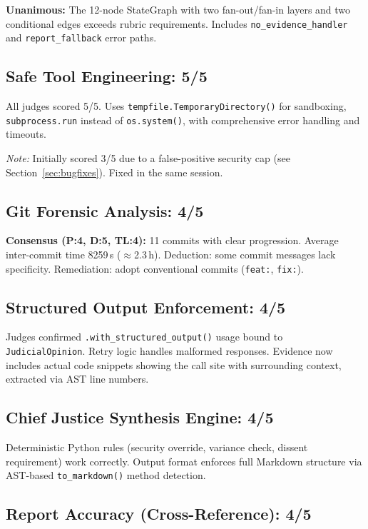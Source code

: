 \documentclass[11pt,a4paper]{article}
\begin{document}
\textbf{Unanimous:} The 12-node StateGraph with two fan-out/fan-in layers
and two conditional edges exceeds rubric requirements.  Includes
\texttt{no\_evidence\_handler} and \texttt{report\_fallback} error paths.

\subsection{Safe Tool Engineering: 5/5}

All judges scored 5/5.  Uses \texttt{tempfile.TemporaryDirectory()} for
sandboxing, \texttt{subprocess.run} instead of \texttt{os.system()}, with
comprehensive error handling and timeouts.

\textit{Note:} Initially scored 3/5 due to a false-positive security cap
(see Section~\ref{sec:bugfixes}).  Fixed in the same session.

\subsection{Git Forensic Analysis: 4/5}

\textbf{Consensus (P:4, D:5, TL:4):} 11 commits with clear progression.
Average inter-commit time 8259\,s ($\approx$2.3\,h).  Deduction: some commit
messages lack specificity.  Remediation: adopt conventional commits
(\texttt{feat:}, \texttt{fix:}).

\subsection{Structured Output Enforcement: 4/5}

Judges confirmed \texttt{.with\_structured\_output()} usage bound to
\texttt{JudicialOpinion}.  Retry logic handles malformed responses.
Evidence now includes actual code snippets showing the call site with
surrounding context, extracted via AST line numbers.

\subsection{Chief Justice Synthesis Engine: 4/5}

Deterministic Python rules (security override, variance check, dissent
requirement) work correctly.  Output format enforces full Markdown structure
via AST-based \texttt{to\_markdown()} method detection.

\subsection{Report Accuracy (Cross-Reference): 4/5}
\end{document}
